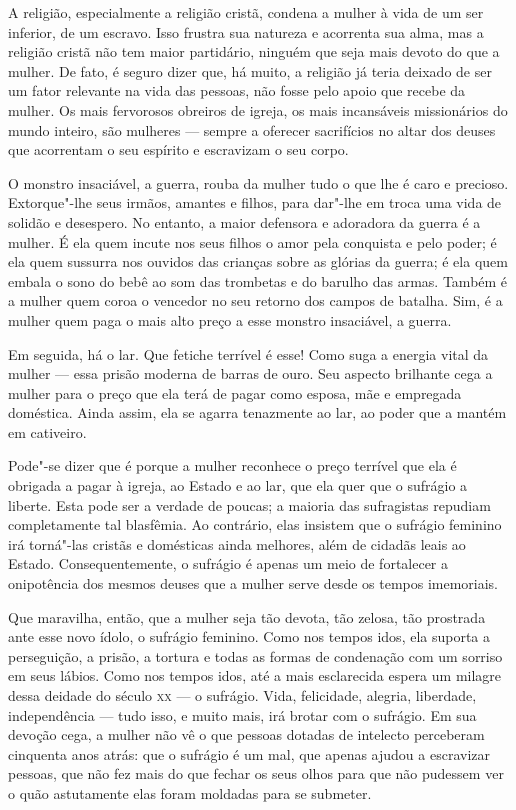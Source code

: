 A religião, especialmente a religião cristã, condena a mulher à vida de
um ser inferior, de um escravo. Isso frustra sua natureza e
acorrenta sua alma, mas a religião cristã não tem maior partidário,
ninguém que seja mais devoto do que a mulher. De fato, é seguro dizer
que, há muito, a religião já teria deixado de ser um fator relevante na vida das
pessoas, não fosse pelo apoio que recebe da mulher. Os mais fervorosos
obreiros de igreja, os mais incansáveis missionários ​​do mundo inteiro,
são mulheres --- sempre a oferecer sacrifícios no altar dos deuses que
acorrentam o seu espírito e escravizam o seu corpo.

O monstro insaciável, a guerra, rouba da mulher tudo o que lhe é caro e
precioso. Extorque"-lhe seus irmãos, amantes e filhos, para dar"-lhe em troca
uma vida de solidão e desespero. No entanto, a maior defensora e
adoradora da guerra é a mulher. É ela quem incute nos seus filhos o amor pela conquista e pelo poder; é ela quem sussurra nos ouvidos das crianças sobre as glórias da guerra; é ela quem embala o sono do bebê ao som das
trombetas e do barulho das armas. Também é a mulher quem coroa o vencedor no
seu retorno dos campos de batalha. Sim, é a mulher quem paga o mais alto
preço a esse monstro insaciável, a guerra.

Em seguida, há o lar. Que fetiche terrível é esse! Como suga a energia
vital da mulher --- essa prisão moderna de barras de ouro. Seu aspecto
brilhante cega a mulher para o preço que ela terá de pagar como esposa,
mãe e empregada doméstica. Ainda assim, ela se agarra tenazmente ao lar,
ao poder que a mantém em cativeiro.

Pode"-se dizer que é porque a mulher reconhece o preço terrível que ela é
obrigada a pagar à igreja, ao Estado e ao lar, que ela quer que o
sufrágio a liberte. Esta pode ser a verdade de poucas; a maioria das
sufragistas repudiam completamente tal blasfêmia. Ao contrário, elas
insistem que o sufrágio feminino irá torná"-las cristãs e domésticas
ainda melhores, além de cidadãs leais ao Estado. Consequentemente, o
sufrágio é apenas um meio de fortalecer a onipotência dos mesmos deuses
que a mulher serve desde os tempos imemoriais.

Que maravilha, então, que a mulher seja tão devota, tão zelosa, tão
prostrada ante esse novo ídolo, o sufrágio feminino. Como nos tempos
idos, ela suporta a perseguição, a prisão, a tortura e todas as formas
de condenação com um sorriso em seus lábios. Como nos tempos idos, até a
mais esclarecida espera um milagre dessa deidade do século \textsc{xx} --- o
sufrágio. Vida, felicidade, alegria, liberdade, independência --- tudo
isso, e muito mais, irá brotar com o sufrágio. Em sua devoção cega, a
mulher não vê o que pessoas dotadas de intelecto perceberam cinquenta
anos atrás: que o sufrágio é um mal, que apenas ajudou a escravizar
pessoas, que não fez mais do que fechar os seus olhos para que não
pudessem ver o quão astutamente elas foram moldadas para se submeter.

